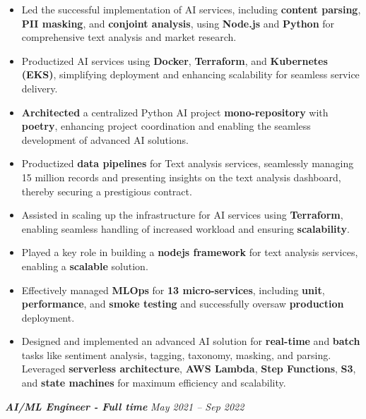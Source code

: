 \documentclass[11pt,a4paper]{article}
\newcommand{\resumeItem}[1]{\item #1}
\begin{document}
\begin{itemize}[leftmargin=1.5em, itemsep=1pt, topsep=3pt, label=\textopenbullet]
  \resumeItem{Led the successful implementation of AI services, including \textbf{content parsing}, \textbf{PII masking}, and \textbf{conjoint analysis}, using \textbf{Node.js} and \textbf{Python} for comprehensive text analysis and market research.}
  \resumeItem{Productized AI services using \textbf{Docker}, \textbf{Terraform}, and \textbf{Kubernetes (EKS)}, simplifying deployment and enhancing scalability for seamless service delivery.}
  \resumeItem{\textbf{Architected} a centralized Python AI project \textbf{mono-repository} with \textbf{poetry}, enhancing project coordination and enabling the seamless development of advanced AI solutions.}
  \resumeItem{Productized \textbf{data pipelines} for Text analysis services, seamlessly managing 15 million records and presenting insights on the text analysis dashboard, thereby securing a prestigious contract.}
  \resumeItem{Assisted in scaling up the infrastructure for AI services using \textbf{Terraform}, enabling seamless handling of increased workload and ensuring \textbf{scalability}.}
  \resumeItem{Played a key role in building a \textbf{nodejs framework} for text analysis services, enabling a \textbf{scalable} solution.}
  \resumeItem{Effectively managed \textbf{MLOps} for \textbf{13 micro-services}, including \textbf{unit}, \textbf{performance}, and \textbf{smoke testing} and successfully oversaw \textbf{production} deployment.}
  \resumeItem{Designed and implemented an advanced AI solution for \textbf{real-time} and \textbf{batch} tasks like sentiment analysis, tagging, taxonomy, masking, and parsing. Leveraged \textbf{serverless architecture}, \textbf{AWS Lambda}, \textbf{Step Functions}, \textbf{S3}, and \textbf{state machines} for maximum efficiency and scalability.}
\end{itemize}

\vspace{4pt}
\noindent\textit{\textbf{AI/ML Engineer - Full time}} \hfill \textit{May 2021 -- Sep 2022}
\end{document}
